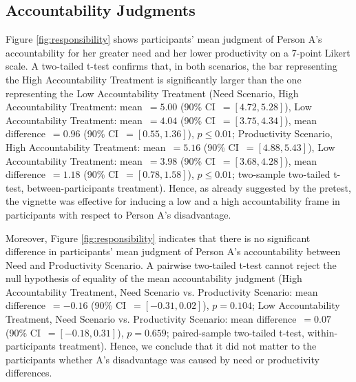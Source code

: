 \documentclass[smallcondensed]{svjour3}
\begin{document}
\subsection{Accountability Judgments}\label{sec:accountability}
%
Figure \ref{fig:responsibility} shows participants' mean judgment of Person A's accountability for her greater need and her lower productivity on a 7-point Likert scale. A two-tailed t-test confirms that, in both scenarios, the bar representing the High Accountability Treatment is significantly larger than the one representing the Low Accountability Treatment (Need Scenario, High Accountability Treatment: mean~$=5.00$ (90\% CI~$=[ 4.72,5.28]$), Low Accountability Treatment: mean~$=4.04$ (90\% CI~$=[3.75,4.34]$), mean difference~$=0.96$ (90\% CI~$=[0.55, 1.36]$), $p\le0.01$; Productivity Scenario, High Accountability Treatment: mean~$=5.16 $ (90\% CI~$=[4.88,5.43]$), Low Accountability Treatment: mean~$=3.98$ (90\% CI~$=[3.68,4.28]$), mean difference~$=1.18$ (90\% CI~$=[0.78,1.58]$), $p\le0.01$; two-sample two-tailed t-test, between-participants treatment). Hence, as already suggested by the pretest, the vignette was effective for inducing a low and a high accountability frame in participants with respect to Person A's disadvantage.\par
%
Moreover, Figure \ref{fig:responsibility} indicates that there is no significant difference in participants' mean judgment of Person A's accountability between Need and Productivity Scenario. A pairwise two-tailed t-test cannot reject the null hypothesis of equality of the mean accountability judgment (High Accountability Treatment, Need Scenario vs. Productivity Scenario: mean difference~$= -0.16$ (90\% CI~$=[-0.31, 0.02]$), $p = 0.104$; Low Accountability Treatment, Need Scenario vs. Productivity Scenario: mean difference~$=0.07$ (90\% CI~$=[-0.18, 0.31]$), $p = 0.659$; paired-sample two-tailed t-test, within-participants treatment). Hence, we conclude that it did not matter to the participants whether A's disadvantage was caused by need or productivity differences.\par
%
\end{document}

